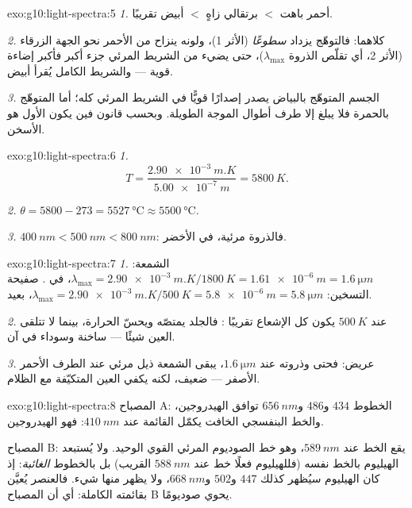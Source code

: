 \begin{solution}{exo:g10:light-spectra:5}
\emph{1.} أحمر باهت $<$ برتقالي زاهٍ $<$ أبيض تقريبًا.

\emph{2.} كلاهما: فالتوهّج يزداد \emph{سطوعًا} (الأثر 1)، ولونه
ينزاح من الأحمر نحو الجهة الزرقاء (الأثر 2، أي تقلّص الذروة
$\lambda_{\max}$)، حتى يضيء من الشريط المرئي جزء أكبر فأكبر إضاءة قوية ---
والشريط الكامل يُقرأ أبيض.

\emph{3.} الجسم المتوهّج بالبياض يصدر إصدارًا قويًّا في الشريط المرئي
كله؛ أما المتوهّج بالحمرة فلا يبلغ إلا طرف أطوال الموجة الطويلة. وبحسب
قانون فين يكون الأول هو الأسخن.
\end{solution}

\begin{solution}{exo:g10:light-spectra:6}
\emph{1.}
\[
T = \frac{\qty{2.90e-3}{m.K}}{\qty{5.00e-7}{m}} = \qty{5800}{K}.
\]

\emph{2.} $\theta = 5800 - 273 = \qty{5527}{\degreeCelsius} \approx
\qty{5500}{\degreeCelsius}$.

\emph{3.} $\qty{400}{nm} < \qty{500}{nm} < \qty{800}{nm}$: فالذروة
مرئية، في الأخضر.
\end{solution}

\begin{solution}{exo:g10:light-spectra:7}
\emph{1.} الشمعة:
$\lambda_{\max} = \qty{2.90e-3}{m.K} / \qty{1800}{K} = \qty{1.61e-6}{m}
= \qty{1.6}{\micro m}$، في . صفيحة التسخين:
$\lambda_{\max} = \qty{2.90e-3}{m.K} / \qty{500}{K} = \qty{5.8e-6}{m}
= \qty{5.8}{\micro m}$،  بعيد.

\emph{2.} عند $\qty{500}{K}$ يكون كل الإشعاع تقريبًا :
فالجلد يمتصّه ويحسّ الحرارة، بينما لا تتلقى العين شيئًا --- ساخنة
وسوداء في آن.

\emph{3.}  عريض: فحتى وذروته عند
$\qty{1.6}{\micro m}$، يبقى  الشمعة ذيل مرئي عند
الطرف الأحمر الأصفر --- ضعيف، لكنه يكفي العين المتكيّفة مع الظلام.
\end{solution}

\begin{solution}{exo:g10:light-spectra:8}
المصباح A: الخطوط $434$ و$486$ و$\qty{656}{nm}$ توافق الهيدروجين، والخط
البنفسجي الخافت يكمّل القائمة عند $\qty{410}{nm}$: فهو الهيدروجين.

المصباح B: يقع الخط عند $\qty{589}{nm}$، وهو خط الصوديوم المرئي القوي
الوحيد. ولا يُستبعد الهيليوم بالخط نفسه (فللهيليوم فعلًا خط
عند $\qty{588}{nm}$ القريب) بل بالخطوط \emph{الغائبة}: إذ كان الهيليوم
سيُظهر كذلك $447$ و$502$ و$\qty{668}{nm}$، ولا يظهر منها شيء. فالعنصر
يُعيَّن بقائمته الكاملة: أي أن المصباح B يحوي صوديومًا.
\end{solution}

